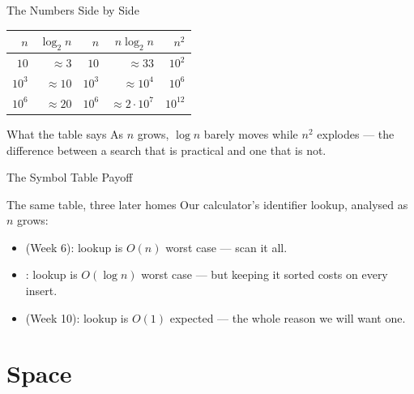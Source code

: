 \documentclass[aspectratio=169]{beamer}
\begin{document}
\begin{frame}{The Numbers Side by Side}
  \begin{center}
  \begin{tabular}{rrrrr}
    \toprule
    $n$ & $\log_2 n$ & $n$ & $n \log_2 n$ & $n^2$ \\
    \midrule
    $10$      & $\approx 3$   & $10$        & $\approx 33$    & $10^2$ \\
    $10^3$    & $\approx 10$  & $10^3$      & $\approx 10^4$  & $10^6$ \\
    $10^6$    & $\approx 20$  & $10^6$      & $\approx 2\cdot10^7$ & $10^{12}$ \\
    \bottomrule
  \end{tabular}
  \end{center}
  \begin{block}{What the table says}
    As $n$ grows, $\log n$ barely moves while $n^2$ explodes --- the difference
    between a search that is practical and one that is not.
  \end{block}
\end{frame}

\begin{frame}{The Symbol Table Payoff}
  \begin{block}{The same table, three later homes}
    Our calculator's identifier lookup, analysed as $n$ grows:
  \end{block}
  \begin{itemize}
    \item {} (Week 6): lookup is $O(n)$ worst case --- scan it all.
    \item {}: lookup is $O(\log n)$ worst case --- but keeping it
      sorted costs on every insert.
    \item {} (Week 10): lookup is $O(1)$ expected --- the whole
      reason we will want one.
  \end{itemize}
  \vspace{0.15cm}
\end{frame}


\section{Space}
\end{document}
